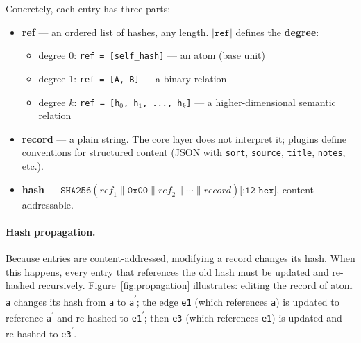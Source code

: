 \noindent Concretely, each entry has three parts:
\begin{itemize}
  \item \textbf{ref} --- an ordered list of hashes, any length. $|\texttt{ref}|$ defines the \textbf{degree}:
    \begin{itemize}
      \item degree 0: \texttt{ref = [self\_hash]} --- an atom (base unit)
      \item degree 1: \texttt{ref = [A, B]} --- a binary relation
      \item degree $k$: \texttt{ref = [h$_0$, h$_1$, ..., h$_k$]} --- a higher-dimensional semantic relation
    \end{itemize}
  \item \textbf{record} --- a plain string. The core layer does not interpret it; plugins define conventions for structured content (JSON with \texttt{sort}, \texttt{source}, \texttt{title}, \texttt{notes}, etc.).
  \item \textbf{hash} --- $\texttt{SHA256}(\mathit{ref}_1 \| \texttt{0x00} \| \mathit{ref}_2 \| \cdots \| \mathit{record})\texttt{[:12 hex]}$, content-addressable.
\end{itemize}

\paragraph{Hash propagation.}
Because entries are content-addressed, modifying a record changes its hash. When this happens, every entry that references the old hash must be updated and re-hashed recursively. Figure~\ref{fig:propagation} illustrates: editing the record of atom \texttt{a} changes its hash from \texttt{a} to \texttt{a\textsuperscript{$\prime$}}; the edge \texttt{e1} (which references \texttt{a}) is updated to reference \texttt{a\textsuperscript{$\prime$}} and re-hashed to \texttt{e1\textsuperscript{$\prime$}}; then \texttt{e3} (which references \texttt{e1}) is updated and re-hashed to \texttt{e3\textsuperscript{$\prime$}}.

